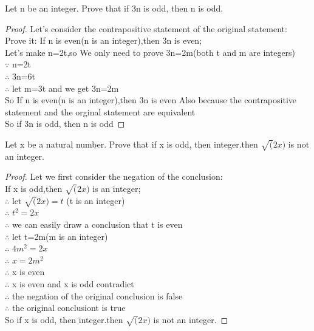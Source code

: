\documentclass[11pt, a4paper, UTF8]{ctexart}
\begin{document}
\begin{problem}[UD:3.10]
 Let n be an integer. Prove that if 3n is odd, then n is odd.
\end{problem}

\begin{proof}
 Let's consider the contrapositive statement of the original statement:\\
 Prove it: If n is even(n is an integer),then 3n is even;\\
 Let's make n=2t,so We only need to prove 3n=2m(both t and m are integers)\\
 $\because$ n=2t\\
 $\therefore$ 3n=6t\\
 $\therefore$ let m=3t and we get 3n=2m\\
 So If n is even(n is an integer),then 3n is even
 Also because the contrapositive statement and the orginal statement are equivalent\\
 So if 3n is odd, then n is odd
\end{proof}


\begin{problem}[UD:3.11]
Let x be a natural number. Prove that if x is odd, then integer.then $\surd(2x)$ is not an integer.
\end{problem}

\begin{proof}
 Let we first consider the negation of the conclusion:\\
 If x is odd,then $\surd(2x)$ is an integer;\\
 $\therefore$ let $\surd(2x)=t$ (t is an integer) \\
 $\therefore$ $t^2=2x$\\
 $\therefore$ we can easily draw a conclusion that t is even\\
 $\therefore$ let t=2m(m is an integer) \\
 $\therefore$ $4m^2=2x$\\
 $\therefore$ $x=2m^2$\\
 $\therefore$ x is even\\
 $\therefore$ x is even and x is odd contradict\\
 $\therefore$ the negation of the original conclusion is false\\
 $\therefore$ the original conclusiont is true\\
 So if x is odd, then integer.then $\surd(2x)$ is not an integer.

\end{proof}
\end{document}
